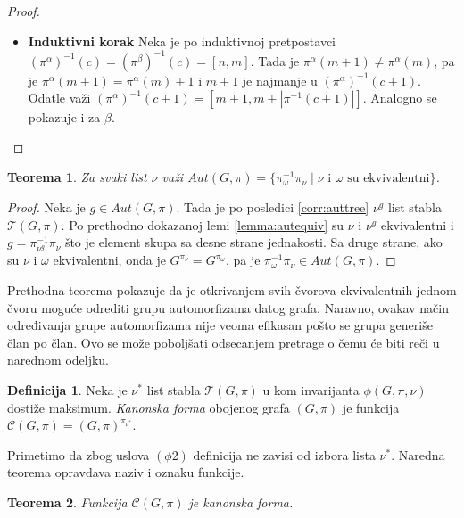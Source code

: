 \documentclass[12pt,oneside]{memoir}
\newtheorem{theorem}{Teorema}
\theoremstyle{definition}
\newtheorem*{definition}{Definicija}
\begin{document}
\begin{proof}
\begin{enumerate}
\begin{itemize}
				  \item[] \textbf{Induktivni korak} Neka je po induktivnoj
					  pretpostavci $(\pi^\alpha)^{-1}(c) = (\pi^\beta)^{-1}(c)
					  = [n, m]$. Tada je $\pi^\alpha(m+1) \neq \pi^\alpha(m)$,
					  pa je $\pi^\alpha(m+1) = \pi^\alpha(m) + 1$ i $m+1$ je
					  najmanje u $(\pi^\alpha)^{-1}(c+1)$. Odatle važi
					  $(\pi^\alpha)^{-1}(c+1) = [m + 1, m + |\pi^{-1}(c+1)|]$.
					  Analogno se pokazuje i za $\beta$.
			  \end{itemize}
	  \end{enumerate}
  \end{proof}

  \begin{theorem}
	  \label{thm:aut}
	  Za svaki list $\nu$ važi $Aut(G, \pi) = \{\pi_{\omega}^{-1}\pi_{\nu}
	  \mid \text{$\nu$ i $\omega$ su ekvivalentni} \}$.
  \end{theorem}
  
  \begin{proof}
	  Neka je $g \in Aut(G, \pi)$. Tada je po posledici \ref{corr:auttree}
	  $\nu^g$ list stabla $\mathcal{T}(G, \pi)$. Po prethodno dokazanoj lemi
	  \ref{lemma:autequiv} su $\nu$ i $\nu^g$ ekvivalentni i $g =
	  \pi_{\nu^g}^{-1}\pi_\nu$ što je element skupa sa desne strane jednakosti.
	  Sa druge strane, ako su $\nu$ i $\omega$ ekvivalentni, onda je
	  $G^{\pi_\nu} = G^{\pi_\omega}$, pa je $\pi_\omega^{-1}\pi_\nu \in Aut(G,
	  \pi)$.
  \end{proof}

	Prethodna teorema pokazuje da je otkrivanjem svih čvorova ekvivalentnih
	jednom čvoru moguće odrediti grupu automorfizama datog grafa. Naravno,
	ovakav način određivanja grupe automorfizama nije veoma efikasan pošto se
	grupa generiše član po član. Ovo se može poboljšati odsecanjem pretrage o
	čemu će biti reči u narednom odeljku.

  \begin{definition}
	  Neka je $\nu^*$ list stabla $\mathcal{T}(G, \pi)$ u kom invarijanta
	  $\phi(G, \pi, \nu)$ dostiže maksimum. \emph{Kanonska forma} obojenog
	  grafa $(G, \pi)$ je funkcija $\mathcal{C}(G, \pi) = (G,
	  \pi)^{\pi_{\nu^*}}$.
  \end{definition}

  Primetimo da zbog uslova $(\phi2)$ definicija ne zavisi od izbora lista
  $\nu^*$. Naredna teorema opravdava naziv i oznaku funkcije.

  \begin{theorem}
	  Funkcija $\mathcal{C}(G, \pi)$ je kanonska forma.
  \end{theorem}
\end{document}
